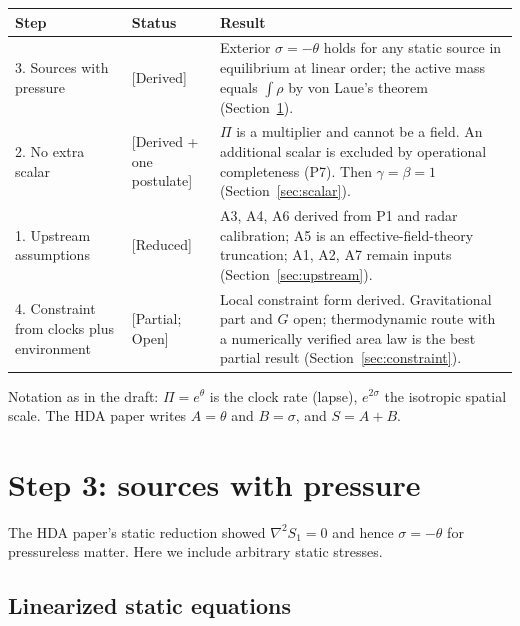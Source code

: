 \documentclass[11pt]{article}
\newcommand{\Pg}{\Pi}
\newcommand{\thP}{\theta}
\newcommand{\sgP}{\sigma}
\newcommand{\st}[1]{\textsf{\small[#1]}}
\theoremstyle{plain}
\theoremstyle{definition}
\theoremstyle{remark}
\begin{document}
\begin{longtable}{@{}p{}p{}p{}@{}}
\toprule
Step & Status & Result \\
\midrule
3. Sources with pressure & \st{Derived} & Exterior $\sgP=-\thP$ holds for any static source in equilibrium at linear order; the active mass equals $\int\rho$ by von Laue's theorem (Section~\ref{sec:pressure}). \\
2. No extra scalar & \st{Derived + one postulate} & $\Pg$ is a multiplier and cannot be a field. An additional scalar is excluded by operational completeness (P7). Then $\gamma=\beta=1$ (Section~\ref{sec:scalar}). \\
1. Upstream assumptions & \st{Reduced} & A3, A4, A6 derived from P1 and radar calibration; A5 is an effective-field-theory truncation; A1, A2, A7 remain inputs (Section~\ref{sec:upstream}). \\
4. Constraint from clocks plus environment & \st{Partial; Open} & Local constraint form derived. Gravitational part and $G$ open; thermodynamic route with a numerically verified area law is the best partial result (Section~\ref{sec:constraint}). \\
\bottomrule
\end{longtable}

Notation as in the draft: $\Pg=e^{\thP}$ is the clock rate (lapse), $e^{2\sgP}$ the isotropic spatial scale. The HDA paper writes $A=\thP$ and $B=\sgP$, and $S=A+B$.

\section{Step 3: sources with pressure}
\label{sec:pressure}

The HDA paper's static reduction showed $\nabla^2 S_1=0$ and hence $\sgP=-\thP$ for pressureless matter. Here we include arbitrary static stresses.

\subsection{Linearized static equations}
\end{document}
